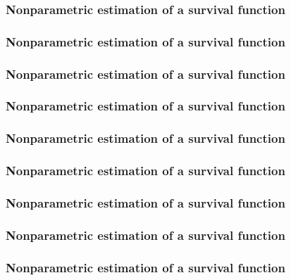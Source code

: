 \documentclass[12pt, 
hyperref={colorlinks=true, linkcolor=blue, urlcolor=cyan},dvipsnames]{beamer}
\begin{document}
\begin{frame}
\frametitle{Nonparametric estimation of a survival function}

\end{frame}

\begin{frame}
\frametitle{Nonparametric estimation of a survival function}

\end{frame}

\begin{frame}
\frametitle{Nonparametric estimation of a survival function}

\end{frame}

\begin{frame}
\frametitle{Nonparametric estimation of a survival function}

\end{frame}

\begin{frame}
\frametitle{Nonparametric estimation of a survival function}

\end{frame}

\begin{frame}
\frametitle{Nonparametric estimation of a survival function}

\end{frame}

\begin{frame}
\frametitle{Nonparametric estimation of a survival function}

\end{frame}


\begin{frame}
\frametitle{Nonparametric estimation of a survival function}

\end{frame}

\begin{frame}
\frametitle{Nonparametric estimation of a survival function}

\end{frame}
\end{document}
